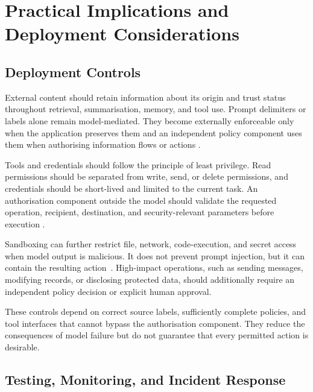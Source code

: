 \section{Practical Implications and Deployment Considerations}
\label{sec:praxis}

\subsection{Deployment Controls}
\label{subsec:deployment-controls}

External content should retain information about its origin and trust status throughout
retrieval, summarisation, memory, and tool use. Prompt delimiters or labels alone
remain model-mediated. They become externally enforceable only when the
application preserves them and an independent policy component uses them when
authorising information flows or actions
\parencites{hines2024spotlighting}{wu2024systemlevel}.

Tools and credentials should follow the principle of least privilege. Read
permissions should be separated from write, send, or delete permissions, and
credentials should be short-lived and limited to the current task. An
authorisation component outside the model should validate the requested
operation, recipient, destination, and security-relevant parameters before
execution
\parencites{debenedetti2024agentdojo}
             {debenedetti2025defeating}
             {owasp2025llm}.

Sandboxing can further restrict file, network, code-execution, and secret access
when model output is malicious. It does not prevent prompt injection, but it can
contain the resulting action~\parencites{debenedetti2024agentdojo}{debenedetti2025defeating}{owasp2025llm}. High-impact operations, such as sending messages,
modifying records, or disclosing protected data, should additionally require an
independent policy decision or explicit human approval.  

These controls depend on correct source labels, sufficiently complete
policies, and tool interfaces that cannot bypass the authorisation component.
They reduce the consequences of model failure but do not guarantee that every
permitted action is desirable.

\subsection{Testing, Monitoring, and Incident Response}
\label{subsec:testing-monitoring-response}

